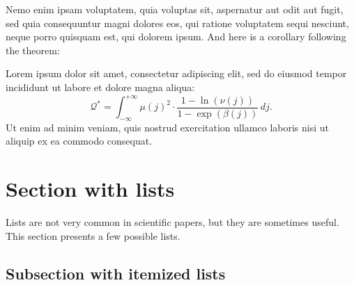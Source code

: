 \documentclass[letterpaper,11pt,leqno]{article}
\begin{document}
Nemo enim ipsam voluptatem, quia voluptas sit, aspernatur aut odit aut fugit, sed quia consequuntur magni dolores eos, qui ratione voluptatem sequi nesciunt, neque porro quisquam est, qui dolorem ipsum. And here is a corollary following the theorem:
\begin{corollary} 
Lorem ipsum dolor sit amet, consectetur adipiscing elit, sed do eiusmod tempor incididunt ut labore et dolore magna aliqua:
\begin{equation*}
\mathcal{Q}^* = \int_{-\infty}^{+\infty} \mu(j)^2 \cdot \frac{1-\ln(\nu(j))}{1-\exp(\beta(j))}\,dj.
\end{equation*}
Ut enim ad minim veniam, quis nostrud exercitation ullamco laboris nisi ut aliquip ex ea commodo consequat.
\end{corollary}

\section{Section with lists}\label{s:lists}

Lists are not very common in scientific papers, but they are sometimes useful. This section presents a few possible lists.

\subsection{Subsection with itemized lists}
\end{document}
